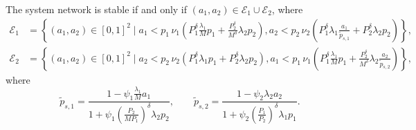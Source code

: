 \begin{proposition} \label{prop:stability}
The system network is stable if and only if $(a_1,a_2) \in \mathcal{E}_1 \cup \mathcal{E}_2$, where
\begin{align*}
	\mathcal{E}_1
    	&= \left\lbrace (a_1,a_2)\in [0,1]^2 \mid
    		a_1 < p_1\,\nu_1\!\left( P_1^\delta\tfrac{\lambda_1}{M}p_1
            	+\tfrac{P_2^\delta}{M^\delta}\lambda_2 p_2\right), 
            a_2 < p_2\,\nu_2\!\left( P_1^\delta\lambda_1
        		\tfrac{a_1}{\widetilde{p}_{s,1}} + P_2^\delta\lambda_2 p_2 \right) \right\rbrace,\\
	\mathcal{E}_2
    	&= \left\lbrace (a_1,a_2)\in [0,1]^2 \mid
    		a_2 < p_2\,\nu_2\!\left( P_1^\delta\lambda_1 p_1
            	+P_2^\delta\lambda_2p_2\right), 
            a_1 < p_1\,\nu_1\!\left(P_1^\delta
        		\tfrac{\lambda_1}{M}p_1+\tfrac{P_2^\delta}{M^\delta}
                \lambda_2\tfrac{a_2}{\widetilde{p}_{s,2}} \right)
			\right\rbrace,
\end{align*}
where
\begin{equation*}
	\widetilde{p}_{s,1} = \frac{1-\psi_1\tfrac{\lambda_1}{M}a_1}
    	{1+\psi_1(\tfrac{P_2}{M P_1})^\delta\lambda_2p_2}, \qquad
    \widetilde{p}_{s,2} = \frac{1-\psi_2\lambda_2 a_2}
    	{1+\psi_2(\tfrac{P_1}{P_2})^\delta\lambda_1 p_1}.
\end{equation*}
\end{proposition}
%

